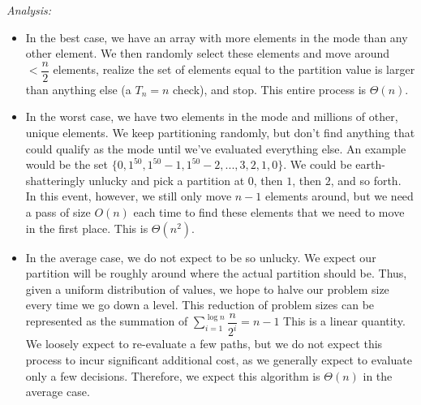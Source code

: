 \textit{Analysis:}
\begin{itemize}
    \item In the best case, we have an array with more elements in the mode than any other element. We then randomly select these elements and move around $ < \dfrac{n}{2}$ elements, realize the set of elements equal to the partition value is larger than anything else (a $T_n = n$ check), and stop. This entire process is $\Theta(n)$.
    \item In the worst case, we have two elements in the mode and millions of other, unique elements. We keep partitioning randomly, but don't find anything that could qualify as the mode until we've evaluated everything else. An example would be the set $\{0, 1^{50}, 1^{50} -1, 1^{50} -2, ..., 3, 2, 1, 0\}$. We could be earth-shatteringly unlucky and pick a partition at $0$, then $1$, then $2$, and so forth. In this event, however, we still only move $n - 1$ elements around, but we need a pass of size $O(n)$ each time to find these elements that we need to move in the first place. This is $\Theta(n^2)$.
    \item In the average case, we do not expect to be so unlucky. We expect our partition will be roughly around where the actual partition should be. Thus, given a uniform distribution of values, we hope to halve our problem size every time we go down a level. This reduction of problem sizes can be represented as the summation of $\sum\limits_{i = 1}^{\log n} \dfrac{n}{2^i} = n - 1$ This is a linear quantity. We loosely expect to re-evaluate a few paths, but we do not expect this process to incur significant additional cost, as we generally expect to evaluate only a few decisions. Therefore, we expect this algorithm is $\Theta(n)$ in the average case.
\end{itemize}